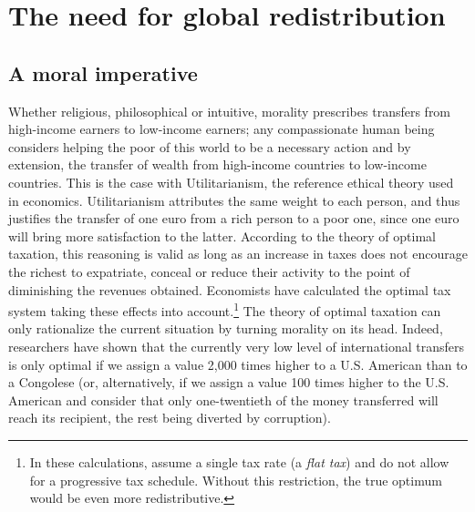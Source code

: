 \documentclass[a5paper,english,openany]{memoir}
\begin{document}
\chapter{The need for global redistribution\label{ch:redistribution_necessaire}}

\section*{A moral imperative} %
Whether religious, philosophical or intuitive, morality %
prescribes transfers from high-income earners to low-income earners; any compassionate human being considers helping the poor of this world to be a necessary action  %
and by extension, the transfer of wealth %
from high-income countries to low-income countries.
This is the case with Utilitarianism, %
the reference ethical theory used in economics. Utilitarianism attributes the same weight to each person, and thus justifies the transfer of one euro from a rich person to a poor one, since one euro will bring more satisfaction to the latter. According to the theory of optimal taxation, this reasoning is valid as long as an increase in taxes does not encourage the richest to expatriate, conceal or reduce their activity to the point of diminishing the revenues obtained. Economists have calculated the optimal tax system taking these effects into account.\footnote{In these calculations, \citet{kopczuk_limitations_2005} assume a single tax rate (a \textit{flat tax}) and do not allow for a progressive tax schedule. Without this restriction, the true optimum would be even more redistributive.} %
The theory of optimal taxation can only rationalize %
the current situation by turning morality %
on its head. Indeed, researchers have shown that the currently very low level of %
international transfers is only optimal if we assign a value 2,000 times higher to a %
U.S. American than to a Congolese (or, alternatively, if we assign a value 100 times higher to the U.S. American and consider that only one-twentieth of the money transferred will reach its recipient, the rest being diverted by corruption). %
\end{document}
